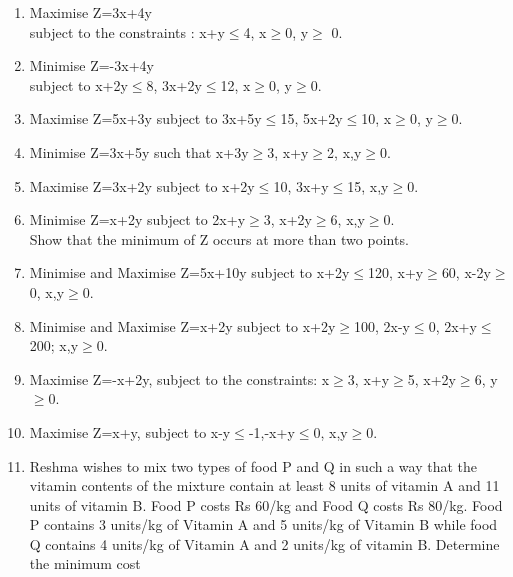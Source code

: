 \begin{enumerate}[label=\arabic*.,ref=\thesubsection.\theenumi]
%
%
%
%
%
%
%
% 
\item Maximise Z=3x+4y\\
subject to the constraints : x+y$\leq$4, x$\geq$0, y$\geq$ 0.\\
\item Minimise Z=-3x+4y\\
subject to x+2y$\leq$8, 3x+2y$\leq$12, x$\geq$0, y$\geq$0.\\
\item Maximise Z=5x+3y
subject to 3x+5y$\leq$15, 5x+2y$\leq$10, x$\geq$0, y$\geq$0.\\
\item Minimise Z=3x+5y
such that x+3y$\geq$3, x+y$\geq$2, x,y$\geq$0.\\
\item Maximise Z=3x+2y
subject to x+2y$\leq$10, 3x+y$\leq$15, x,y$\geq$0.\\
\item Minimise Z=x+2y
subject to 2x+y$\geq$3, x+2y$\geq$6, x,y$\geq$0.\\
Show that the minimum of Z occurs at more than two points.\\
\item Minimise and Maximise Z=5x+10y
subject to x+2y$\leq$120, x+y$\geq$60, x-2y$\geq$0, x,y$\geq$0.\\
\item Minimise and Maximise Z=x+2y
subject to x+2y$\geq$100, 2x-y$\leq$0, 2x+y$\leq$200; x,y$\geq$0.\\
\item Maximise Z=-x+2y, subject to the constraints:
x$\geq$3, x+y$\geq$5, x+2y$\geq$6, y$\geq$0.\\
\item Maximise Z=x+y, subject to x-y$\leq$-1,-x+y$\leq$0, x,y$\geq$0.\\
\item Reshma wishes to mix two types of food P and Q in such a way that the vitamin
contents of the mixture contain at least 8 units of vitamin A and 11 units of
vitamin B. Food P costs Rs 60/kg and Food Q costs Rs 80/kg. Food P contains
3 units/kg of Vitamin A and 5 units/kg of Vitamin B while food Q contains
4 units/kg of Vitamin A and 2 units/kg of vitamin B. Determine the minimum cost

\end{enumerate}
